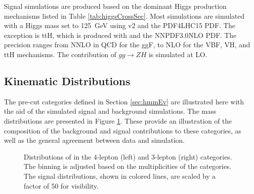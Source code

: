 Signal simulations are produced based on the dominant Higgs production mechanisms listed in Table \ref{tab:higgsCrossSec}.
Most simulations are simulated with a Higgs mass set to 125~GeV using \powheg v2 and the PDF4LHC15 PDF. 
The exception is ttH, which is produced with \madgraph and the NNPDF3.0NLO PDF.
The precision ranges from NNLO in QCD for the ggF, to NLO for the VBF, VH, and ttH mechanisms.
The contribution of $gg\to ZH$ is simulated at LO.


\subsection{Kinematic Distributions}\label{sec:hmmKine}

The pre-cut categories defined in Section \ref{sec:hmmEv} are illustrated here with the aid of the simulated signal and background simulations.
The mass distributions are presented in Figure \ref{fig:hmmPrecutMassHists}.
These provide an illustration of the composition of the background and signal contributions to these categories, as well as the general agreement between data and simulation. 

\begin{figure}[h!]
\captionsetup[subfigure]{position=b}
\centering
{} %
\caption{Distributions of \muu in the 4-lepton (left) and 3-lepton (right) categories. The binning is adjusted based on the multiplicities of the categories. The signal distributions, shown in colored lines, are scaled by a factor of 50 for visibility.}
\label{fig:hmmPrecutMassHists}
\end{figure}

